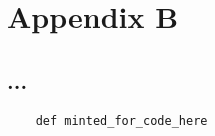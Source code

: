 \section{Appendix B}
\subsection{...}

\begin{verbatim}
    def minted_for_code_here

\end{verbatim}

\newpage
